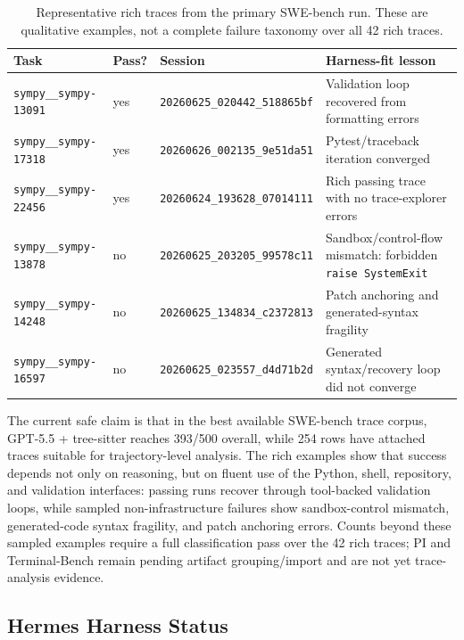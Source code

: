 \documentclass[11pt, logo, onecolumn, copyright, colorlinks=true, allcolors=blue]{nvidiatechreport}
\begin{document}
\begin{table}[h]
\centering
\caption{Representative rich traces from the primary SWE-bench run. These are
qualitative examples, not a complete failure taxonomy over all 42 rich traces.}
\label{tab:swebench-representative-traces}
\begin{tabular}{llll}
\toprule
\textbf{Task} & \textbf{Pass?} & \textbf{Session} & \textbf{Harness-fit lesson} \\
\midrule
\texttt{sympy\_\_sympy-13091} & yes & \texttt{20260625\_020442\_518865bf} & Validation loop recovered from formatting errors \\
\texttt{sympy\_\_sympy-17318} & yes & \texttt{20260626\_002135\_9e51da51} & Pytest/traceback iteration converged \\
\texttt{sympy\_\_sympy-22456} & yes & \texttt{20260624\_193628\_07014111} & Rich passing trace with no trace-explorer errors \\
\texttt{sympy\_\_sympy-13878} & no & \texttt{20260625\_203205\_99578c11} & Sandbox/control-flow mismatch: forbidden \texttt{raise SystemExit} \\
\texttt{sympy\_\_sympy-14248} & no & \texttt{20260625\_134834\_c2372813} & Patch anchoring and generated-syntax fragility \\
\texttt{sympy\_\_sympy-16597} & no & \texttt{20260625\_023557\_d4d71b2d} & Generated syntax/recovery loop did not converge \\
\bottomrule
\end{tabular}
\end{table}

The current safe claim is that in the best available SWE-bench trace corpus,
GPT-5.5 + tree-sitter reaches 393/500 overall, while 254 rows have attached
traces suitable for trajectory-level analysis. The rich examples show that
success depends not only on reasoning, but on fluent use of the Python, shell,
repository, and validation interfaces: passing runs recover through tool-backed
validation loops, while sampled non-infrastructure failures show sandbox-control
mismatch, generated-code syntax fragility, and patch anchoring errors. Counts
beyond these sampled examples require a full classification pass over the 42
rich traces; PI and Terminal-Bench remain pending artifact grouping/import and
are not yet trace-analysis evidence.

\subsection{Hermes Harness Status}
\label{sec:evaluation:hermes}
\end{document}
